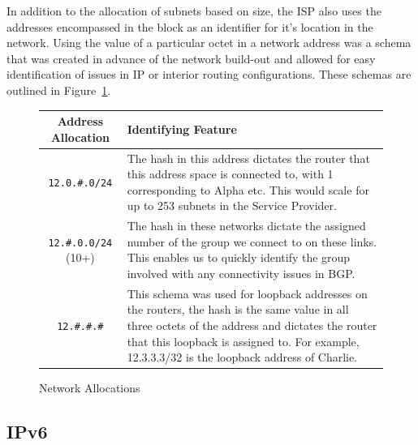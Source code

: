 In addition to the allocation of subnets based on size, the ISP also uses the
addresses encompassed in the block as an identifier for it's location in the
network. Using the value of a particular octet in a network address was a schema
that was created in advance of the network build-out and allowed for easy
identification of issues in IP or interior routing configurations. These schemas
are outlined in Figure~\ref{figure:network-alloc-2}.

\begin{figure}[!ht]
    \caption{Network Allocations}
    \label{figure:network-alloc-2}
    \centering
    \begin{tabular}{|c|p{8cm}|}
        \hline
        \textbf{Address Allocation} & \textbf{Identifying Feature} \\

        \hline
        \texttt{12.0.\#.0/24} & The hash in this address dictates the router that
        this address space is connected to, with 1 corresponding to Alpha etc.
        This would scale for up to 253 subnets in the Service Provider.\\

        \hline
        \texttt{12.\#.0.0/24} (10+) & The hash in these networks dictate the assigned
        number of the group we connect to on these links. This enables us to
        quickly identify the group involved with any connectivity issues in
        BGP.\\

        \hline
        \texttt{12.\#.\#.\#} & This schema was used for loopback addresses on the
        routers, the hash is the same value in all three octets of the address
        and dictates the router that this loopback is assigned to. For example,
        12.3.3.3/32 is the loopback address of Charlie.\\
        \hline
    \end{tabular}
\end{figure}
\clearpage

\subsection{IPv6}